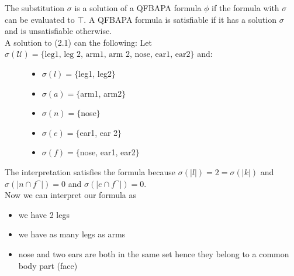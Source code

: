 \documentclass{book}
\theoremstyle{break}
\theoremstyle{definition}
\begin{document}
The substitution $\sigma$ is a solution of a QFBAPA formula $\phi$ if the formula with $\sigma$ can be evaluated to $\top$. A QFBAPA formula is satisfiable if it has a solution $\sigma$ and is unsatisfiable otherwise.\\
A solution to (2.1) can the following: Let $\sigma(\mathcal{U})=\{\text{leg1, leg 2, arm1, arm 2, nose, ear1, ear2}\}$ and:
\begin{figure}[H]
\begin{minipage}[t]{0.5\textwidth}
\raggedright
\begin{itemize}
\item $\sigma(l)=\{$leg1, leg2$\}$
\item $\sigma(a)=\{$arm1, arm2$\}$
\end{itemize}
\end{minipage}%
\begin{minipage}[t]{0.5\textwidth}
\raggedright
\begin{itemize}
\item $\sigma(n)=\{$nose$\}$
\item $\sigma(e)=\{$ear1, ear 2$\}$
\item $\sigma(f)=\{$nose, ear1, ear2$\}$
\end{itemize}
\end{minipage}
\end{figure}
The interpretation satisfies the formula because $\sigma(|l|)=2=\sigma(|k|)$ and $\sigma(|n\cap f^\neg|)=0$ and $\sigma(|e\cap f^\neg|)=0$.\\
Now we can interpret our formula as 
\begin{itemize}
\item we have 2 legs
\item we have as many legs as arms
\item nose and two ears are both in the same set hence they belong to a common body part (face)
\end{itemize}
\end{document}
